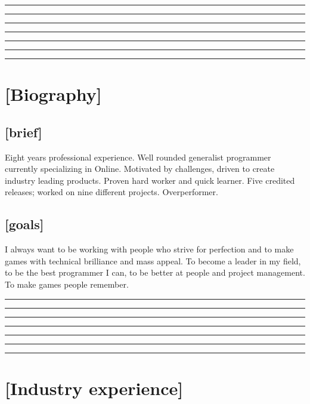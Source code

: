 \documentclass[a4paper]{res}
\newcommand{\setrule}[1]{\rule{#1}{1mm}}
\newcommand{\fibrule}[2]{ \hspace{#1}  \setrule{#2} \setrule{21mm} \setrule{13mm} \setrule{8mm} \setrule{5mm} \setrule{3mm} \setrule{2mm}  \vspace{-.52in} }
\begin{document}
 
\thispagestyle{empty} %
\address{}
\begin{resume}


\fibrule{0.9in}{3.0in}
\section{[Biography]} 

\vspace{-.12in}

\subsection{[brief]}
\mbox{}
\vspace{-.12in}

Eight years professional experience.
Well rounded generalist programmer currently specializing in Online.
Motivated by challenges, driven to create industry leading products.
Proven hard worker and quick learner.
Five credited releases; worked on nine different projects. 
Overperformer.

\vspace{-.22in}

\subsection{[goals]}
\mbox{}
\vspace{-.12in}

I always want to be working with people who strive for perfection and to make games with technical brilliance and mass appeal.
To become a leader in my field, to be the best programmer I can, to be better at people and project management.
To make games people remember.


\fibrule{2.15in}{1.75in}
\section{[Industry experience]}


\end{resume}
\end{document}
